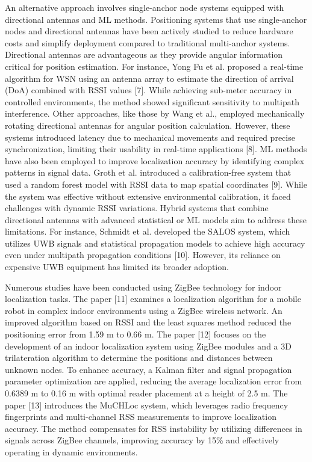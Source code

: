 \begin{multicols}{2}
An alternative approach involves single-anchor node systems equipped
with directional antennas and ML methods. Positioning systems that use
single-anchor nodes and directional antennas have been actively studied
to reduce hardware costs and simplify deployment compared to traditional
multi-anchor systems. Directional antennas are advantageous as they
provide angular information critical for position estimation. For
instance, Yong Fu et al. proposed a real-time algorithm for WSN using an
antenna array to estimate the direction of arrival (DoA) combined with
RSSI values {[}7{]}. While achieving sub-meter accuracy in controlled
environments, the method showed significant sensitivity to multipath
interference. Other approaches, like those by Wang et al., employed
mechanically rotating directional antennas for angular position
calculation. However, these systems introduced latency due to mechanical
movements and required precise synchronization, limiting their usability
in real-time applications {[}8{]}. ML methods have also been employed to
improve localization accuracy by identifying complex patterns in signal
data. Groth et al. introduced a calibration-free system that used a
random forest model with RSSI data to map spatial coordinates {[}9{]}.
While the system was effective without extensive environmental
calibration, it faced challenges with dynamic RSSI variations. Hybrid
systems that combine directional antennas with advanced statistical or
ML models aim to address these limitations. For instance, Schmidt et al.
developed the SALOS system, which utilizes UWB signals and statistical
propagation models to achieve high accuracy even under multipath
propagation conditions {[}10{]}. However, its reliance on expensive UWB
equipment has limited its broader adoption.

Numerous studies have been conducted using ZigBee technology for indoor
localization tasks. The paper {[}11{]} examines a localization algorithm
for a mobile robot in complex indoor environments using a ZigBee
wireless network. An improved algorithm based on RSSI and the least
squares method reduced the positioning error from 1.59 m to 0.66 m. The
paper {[}12{]} focuses on the development of an indoor localization
system using ZigBee modules and a 3D trilateration algorithm to
determine the positions and distances between unknown nodes. To enhance
accuracy, a Kalman filter and signal propagation parameter optimization
are applied, reducing the average localization error from 0.6389 m to
0.16 m with optimal reader placement at a height of 2.5 m. The paper
{[}13{]} introduces the MuCHLoc system, which leverages radio frequency
fingerprints and multi-channel RSS measurements to improve localization
accuracy. The method compensates for RSS instability by utilizing
differences in signals across ZigBee channels, improving accuracy by
15\% and effectively operating in dynamic environments.


\end{multicols}
